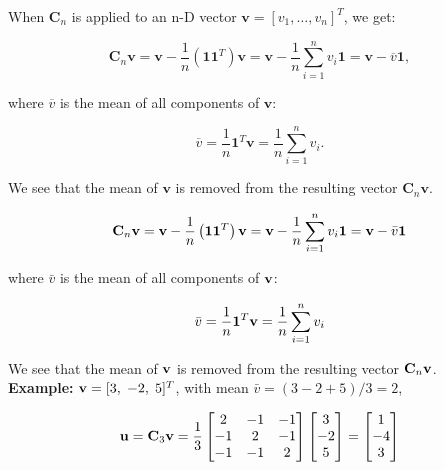 \documentclass[10pt,b5paper,titlepage]{book}
\begin{document}
When $\mathbf{C}_{n}$ is applied to an n-D vector $\mathbf{v} = [v_{1}, \ldots, v_{n}]^{T}$,
we get:

\begin{equation}
    \mathbf{C}_{n}\mathbf{v} = \mathbf{v} - \frac{1}{n}(\mathbf{1}\mathbf{1}^{T})\mathbf{v}
    = \mathbf{v} - \frac{1}{n}
    \sum_{i=1}^{n} v_{i}\mathbf{1} = \mathbf{v} - \overline{v}\mathbf{1}
,\end{equation}

where $\overline{v}$ is the mean of all components of $\mathbf{v}$:

\begin{equation}
    \overline{v} = \frac{1}{n}\mathbf{1}^{T}\mathbf{v}
    = \frac{1}{n} \sum_{i=1}^{n} v_{i}
.\end{equation}

We see that the mean of $\mathbf{v}$ is removed from the resulting vector
$\mathbf{C}_{n}\mathbf{v}$.

\begin{equation}
    {\bf C}_n{\bf v}={\bf v}-\frac{1}{n}\left({\bf 11}^T\right){\bf v}
  ={\bf v}-\frac{1}{n}\sum_{i=1}^nv_i {\bf 1}
  ={\bf v}-\bar{v}{\bf 1}
\end{equation}

where $\bar{v}$ is the mean of all components of ${\bf v}$:

\begin{equation}
    \bar{v}=\frac{1}{n}{\bf 1}^T{\bf v}=\frac{1}{n}\sum_{i=1}^nv_i
\end{equation}

We see that the mean of ${\bf v}$ is removed from the resulting vector ${\bf C}_n{\bf v}$. \\

\textbf{Example:}
${\bf v}=[3,\;-2,\;5]^T$, with mean $\bar{v}=(3-2+5)/3=2$,

\begin{equation}
    {\bf u} = {\bf C}_3 {\bf v}
    = \frac{1}{3} \begin{bmatrix}
        2 & -1 & -1 \\
        -1 & 2 & -1 \\
        -1 & -1 & 2
    \end{bmatrix}
    \begin{bmatrix}
        3 \\
        -2 \\
        5
    \end{bmatrix}
    = \begin{bmatrix}
        1 \\
        -4 \\
        3
    \end{bmatrix}
\end{equation}
\end{document}
